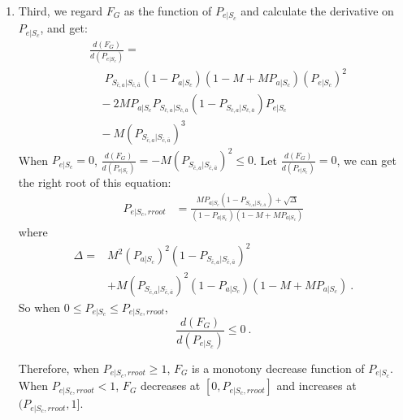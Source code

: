 \begin{enumerate}
\item
 Third, we regard $F_G$ as the function of $P_{e|S_{c}}$ and calculate the derivative on $P_{e|S_{c}}$, and get:
\begin{equation*}
\begin{split}
&\frac{d(F_G)}{d(P_{e|S_{c}})}=\\
&\ \ \ \ \ \ P_{S_{\bar{c}, a}|S_{\bar{c},\bar{a}}}(1-P_{a|S_{c}})(1-M+MP_{a|S_{c}})(P_{e|S_{c}})^2\\
&\ \ \ \ -2MP_{a|S_{c}}P_{S_{\bar{c}, a}|S_{\bar{c},\bar{a}}}(1-P_{S_{\bar{c}, a}|S_{\bar{c},\bar{a}}})P_{e|S_{c}}\\
&\ \ \ \ -M(P_{S_{\bar{c}, a}|S_{\bar{c},\bar{a}}})^3
\end{split}
\end{equation*}
When $P_{e|S_{c}} = 0$, $\frac{d(F_G)}{d(P_{e|S_{c}})} = -M(P_{S_{\bar{c}, a}|S_{\bar{c},\bar{a}}})^2 \leq 0 $.
Let $\frac{d(F_G)}{d(P_{e|S_{c}})} = 0$, we can get the right root of this equation:
\begin{equation}
\begin{split}
P_{e|S_{c},rroot} &= \frac{MP_{a|S_{c}}(1-P_{S_{\bar{c}, a}|S_{\bar{c},\bar{a}}})+\sqrt{\Delta}}{(1-P_{a|S_{c}})(1-M+MP_{a|S_{c}})}
\end{split}
\end{equation}
where
\begin{align}
\Delta = &M^{2}(P_{a|S_{c}})^{2}(1-P_{S_{\bar{c}, a}|S_{\bar{c},\bar{a}}})^2 \nonumber \\
&+ M(P_{S_{\bar{c}, a}|S_{\bar{c},\bar{a}}})^{2}(1-P_{a|S_{c}})(1-M+MP_{a|S_{c}})\  .\nonumber
\end{align}
So when
$
0 \leq P_{e|S_{c}} \leq P_{e|S_{c},rroot}
$,
$$\frac{d(F_G)}{d(P_{e|S_{c}})} \leq 0\ .$$

Therefore, when $P_{e|S_{c},rroot} \geq 1$, $F_G$ is a monotony decrease function of $P_{e|S_{c}}$.
When $P_{e|S_{c},rroot} < 1$, $F_G$ decreases at $[0,P_{e|S_{c},rroot}]$ and increases at $(P_{e|S_{c},rroot},1]$.


\end{enumerate}
